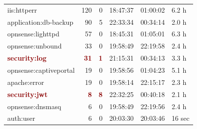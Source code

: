 \begin{table}[hbtp]
\begin{tabular}{|l|r|r|l|l|l|}
iis:httperr & 120 & 0 & 18:47:37 & 01:00:02 & 6.2 h \\
application:db-backup & 90 & 5 & 22:33:34 & 00:34:14 & 2.0 h \\
opnsense:lighttpd & 57 & 0 & 18:45:31 & 01:05:01 & 6.3 h \\
opnsense:unbound & 33 & 0 & 19:58:49 & 22:19:58 & 2.4 h \\
\textcolor{darkred}{\textbf{security:log}} & \textcolor{darkred}{\textbf{31}} & \textcolor{darkred}{\textbf{1}} & 21:15:31 & 00:34:13 & 3.3 h \\
opnsense:captiveportal & 19 & 0 & 19:58:56 & 01:04:23 & 5.1 h \\
apache:error & 19 & 0 & 19:58:14 & 22:15:17 & 2.3 h \\
\textcolor{darkred}{\textbf{security:jwt}} & \textcolor{darkred}{\textbf{8}} & \textcolor{darkred}{\textbf{8}} & 22:32:25 & 00:40:18 & 2.1 h \\
opnsense:dnsmasq & 6 & 0 & 19:58:49 & 22:19:56 & 2.4 h \\
auth:user & 6 & 0 & 20:03:30 & 20:03:46 & 16 sec \\
\hline
\end{tabular}
\end{table}

